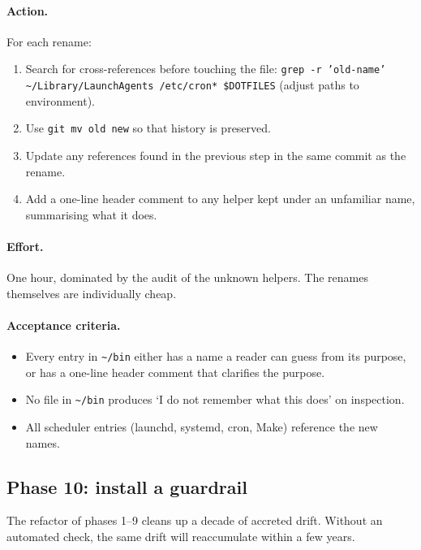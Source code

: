\documentclass[11pt,letterpaper]{scrartcl}
\begin{document}
\paragraph{Action.} For each rename:
\begin{enumerate}
  \item Search for cross-references before touching the file:
        \texttt{grep -r 'old-name' \textasciitilde/Library/LaunchAgents
        /etc/cron* \$DOTFILES} (adjust paths to environment).
  \item Use \texttt{git mv old new} so that history is preserved.
  \item Update any references found in the previous step in the
        same commit as the rename.
  \item Add a one-line header comment to any helper kept under
        an unfamiliar name, summarising what it does.
\end{enumerate}

\paragraph{Effort.} One hour, dominated by the audit of the
unknown helpers. The renames themselves are individually cheap.

\paragraph{Acceptance criteria.}
\begin{itemize}
  \item Every entry in \texttt{\textasciitilde/bin} either has a
        name a reader can guess from its purpose, or has a
        one-line header comment that clarifies the purpose.
  \item No file in \texttt{\textasciitilde/bin} produces `I do
        not remember what this does' on inspection.
  \item All scheduler entries (launchd, systemd, cron, Make)
        reference the new names.
\end{itemize}

\subsection{Phase 10: install a guardrail}

The refactor of phases 1--9 cleans up a decade of accreted drift.
Without an automated check, the same drift will reaccumulate
within a few years.
\end{document}
